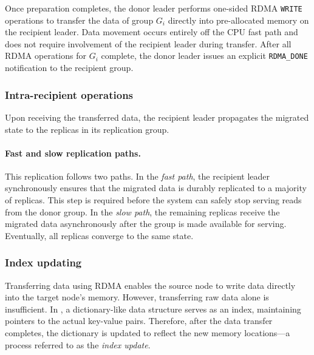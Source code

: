 Once preparation completes, the donor leader performs one-sided RDMA \texttt{WRITE} operations to transfer the data of group $G_i$ directly into pre-allocated memory on the recipient leader.
Data movement occurs entirely off the CPU fast path and does not require involvement of the recipient leader during transfer.
After all RDMA operations for $G_i$ complete, the donor leader issues an explicit \texttt{RDMA\_DONE} notification to the recipient group.

\subsubsection{Intra-recipient operations}
\label{sec:intra-recipient}

Upon receiving the transferred data, the recipient leader propagates the migrated state to the replicas in its replication group.

\paragraph{Fast and slow replication paths.}
This replication follows two paths.
In the \emph{fast path}, the recipient leader synchronously ensures that the migrated data is durably replicated to a majority of replicas.
This step is required before the system can safely stop serving reads from the donor group.
In the \emph{slow path}, the remaining replicas receive the migrated data asynchronously after the group is made available for serving.
Eventually, all replicas converge to the same state.

\subsubsection{Index updating}
\label{sec:index_updating}

Transferring data using RDMA enables the source node to write data directly into the target node's memory.
However, transferring raw data alone is insufficient.
In \OurImplementation{}, a dictionary-like data structure serves as an index, maintaining pointers to the actual key-value pairs.
Therefore, after the data transfer completes, the dictionary is updated to reflect the new memory locations—a process referred to as the \emph{index update}.

